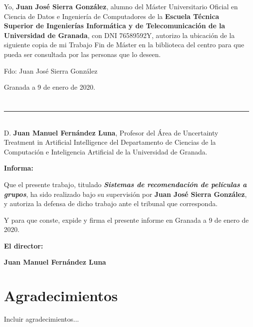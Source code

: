 Yo, \textbf{Juan José Sierra González}, alumno del Máster Universitario Oficial en Ciencia de Datos e Ingeniería de Computadores de la \textbf{Escuela Técnica Superior de Ingenierías Informática y de Telecomunicación de la Universidad de Granada}, con DNI 76589592Y, autorizo la
ubicación de la siguiente copia de mi Trabajo Fin de Máster en la biblioteca del centro para que pueda ser
consultada por las personas que lo deseen.

\vspace{6cm}

\noindent Fdo: Juan José Sierra González

\vspace{2cm}

\begin{flushright}
Granada a 9 de enero de 2020.
\end{flushright}


\chapter*{}
\thispagestyle{empty}

\noindent\rule[-1ex]{\textwidth}{2pt}\\[4.5ex]

D. \textbf{Juan Manuel Fernández Luna}, Profesor del Área de Uncertainty Treatment in Artificial Intelligence del Departamento de Ciencias de la Computación e Inteligencia Artificial de la Universidad de Granada.

\vspace{0.5cm}

\textbf{Informa:}

\vspace{0.5cm}

Que el presente trabajo, titulado \textit{\textbf{Sistemas de recomendación de películas a grupos}},
ha sido realizado bajo su supervisión por \textbf{Juan José Sierra González}, y autoriza la defensa de dicho trabajo ante el tribunal
que corresponda.

\vspace{0.5cm}

Y para que conste, expide y firma el presente informe en Granada a 9 de enero de 2020.

\vspace{1cm}

\textbf{El director:}

\vspace{5cm}

\noindent \textbf{Juan Manuel Fernández Luna}

\chapter*{Agradecimientos}
\thispagestyle{empty}

\vspace{1cm}

Incluir agradecimientos...